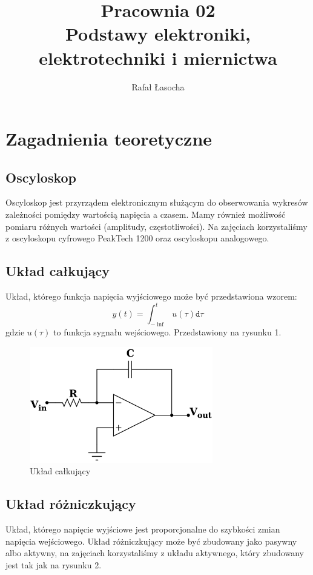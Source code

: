 \documentclass[a4paper,11pt]{article}
\title{
  \textbf{Pracownia 02}\\
  {\Large Podstawy elektroniki, elektrotechniki i miernictwa}
}
\author{Rafał Łasocha}
\begin{document}
\maketitle

\section{Zagadnienia teoretyczne}

\subsection{Oscyloskop}
Oscyloskop jest przyrządem elektronicznym służącym do obserwowania wykresów zależności pomiędzy wartością napięcia a czasem. Mamy również możliwość pomiaru różnych wartości (amplitudy, częstotliwości). Na zajęciach korzystaliśmy z oscyloskopu cyfrowego PeakTech 1200 oraz oscyloskopu analogowego.

\subsection{Układ całkujący}
Układ, którego funkcja napięcia wyjściowego może być przedstawiona wzorem:
$$
y(t) = \int_{-\inf}^t u(\tau) \mathtt{d}\tau
$$
gdzie $u(\tau)$ to funkcja sygnału wejściowego. Przedstawiony na rysunku 1.

\begin{figure}[h]
 \begin{center}
  \includegraphics[width=8cm]{uklad_calkujacy}
 \end{center}
 \caption{Układ całkujący}
\end{figure}

\subsection{Układ różniczkujący}
Układ, którego napięcie wyjściowe jest proporcjonalne do szybkości zmian napięcia wejściowego. Układ różniczkujący może być zbudowany jako pasywny albo aktywny, na zajęciach korzystaliśmy z układu aktywnego, który zbudowany jest tak jak na rysunku 2.
\end{document}
